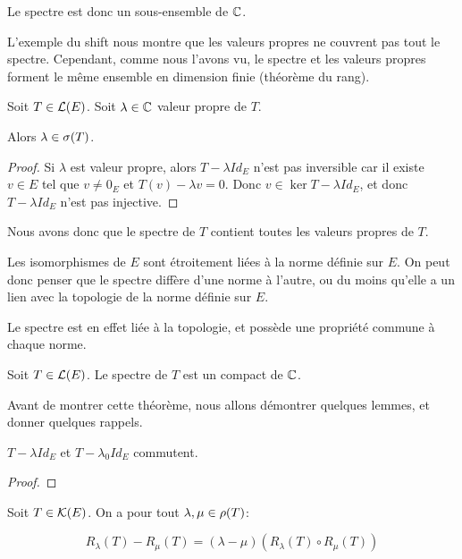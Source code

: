 Le spectre est donc un sous-ensemble de $\mathbb{C}$.

L'exemple du shift nous montre que les valeurs propres ne couvrent pas tout le
spectre.
Cependant, comme nous l'avons vu, le spectre et les valeurs propres forment le
même ensemble en dimension finie (théorème du rang).

\begin{proposition}
	Soit $T \in \mathcal{L}(E)$.
	Soit $\lambda \in \mathbb{C}$ valeur propre de $T$.

	Alors $\lambda \in \sigma(T)$.
\end{proposition}

\begin{proof}
	Si $\lambda$ est valeur propre, alors $T - \lambda Id_{E}$ n'est pas
	inversible car il existe $v \in E$ tel que $v \neq 0_{E}$ et $T(v) - \lambda
	v = 0$. Donc $v \in \ker{T - \lambda Id_{E}}$, et donc $T - \lambda Id_{E}$
	n'est pas injective.
\end{proof}

Nous avons donc que le spectre de $T$ contient toutes les valeurs propres de
$T$.

Les isomorphismes de $E$ sont étroitement liées à la norme définie sur $E$. On
peut donc penser que le spectre diffère d'une norme à l'autre, ou du moins
qu'elle a un lien avec la topologie de la norme définie sur $E$.

Le spectre est en effet liée à la topologie, et possède une propriété commune à
chaque norme.

\begin{theorem}
	\label{thm:spectrum_compact}
	Soit $T \in \mathcal{L}(E)$.
	Le spectre de $T$ est un compact de $\mathbb{C}$.
\end{theorem}

Avant de montrer cette théorème, nous allons démontrer quelques lemmes, et
donner quelques rappels.

\begin{lemma}
	$T - \lambda Id_{E}$ et $T - \lambda_{0} Id_{E}$ commutent.
\end{lemma}

\begin{proof}
	
\end{proof}

\begin{proposition} 
	\label{prop:resolvante_identity}
	Soit $T \in \mathcal{K}(E)$.
	On a pour tout $\lambda, \mu \in \rho(T)$:

	\begin{equation}
		R_{\lambda}(T) - R_{\mu}(T) = (\lambda - \mu) (R_{\lambda}(T) \circ
		R_{\mu}(T))
	\end{equation}
\end{proposition}

